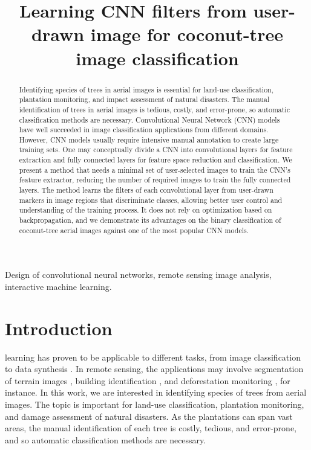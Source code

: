 
\title{Learning CNN filters from user-drawn image  for coconut-tree image classification}

\maketitle

\begin{abstract}
Identifying species of trees in aerial images is essential for land-use classification, plantation monitoring, and impact assessment of natural disasters. The manual identification of trees in aerial images is tedious, costly, and error-prone, so automatic classification methods are necessary. Convolutional Neural Network (CNN) models have well succeeded in image classification applications from different domains. However, CNN models usually require intensive manual annotation to create large training sets. One may conceptually divide a CNN into convolutional layers for feature extraction and fully connected layers for feature space reduction and classification. We present a method that needs a minimal set of user-selected images to train the CNN's feature extractor, reducing the number of required images to train the fully connected layers. The method learns the filters of each convolutional layer from user-drawn markers in image regions that discriminate classes, allowing better user control and understanding of the training process. It does not rely on optimization based on backpropagation, and we demonstrate its advantages on the binary classification of coconut-tree aerial images against one of the most popular CNN models.
\end{abstract}

\begin{IEEEkeywords}
Design of convolutional neural networks, remote sensing image analysis, interactive machine learning.
\end{IEEEkeywords}

\section{Introduction}

 learning has proven to be applicable to different tasks, from image classification to data synthesis \cite{goodfellow2016deep}. In remote sensing, the applications may involve segmentation of terrain images \cite{kemker2018algorithms, kampffmeyer2016semantic}, building identification \cite{xu2018building, lu2018detecting, liu2018multilevel}, and deforestation monitoring \cite{bragilevsky2017deep}, for instance. In this work, we are interested in identifying species of trees from aerial images. The topic is important for land-use classification, plantation monitoring, and damage assessment of natural disasters. As the plantations can span vast areas, the manual identification of each tree is costly, tedious, and error-prone, and so automatic classification methods are necessary. 

